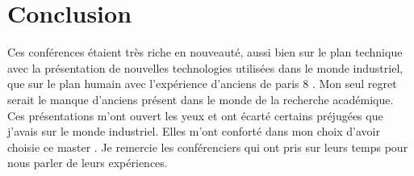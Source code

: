 \part*{Conclusion}

Ces conférences étaient très riche en nouveauté, aussi bien sur le plan technique avec la présentation de nouvelles technologies utilisées dans le monde industriel, que sur le plan humain avec l'expérience d'anciens de paris 8 . Mon seul regret serait le manque d'anciens présent dans le monde de la recherche académique. Ces présentations m’ont ouvert les yeux et ont écarté certains préjugées que j'avais sur le monde industriel. Elles m’ont conforté dans mon choix d'avoir choisie ce master . Je remercie les conférenciers qui ont pris sur leurs temps pour nous parler de leurs expériences.  